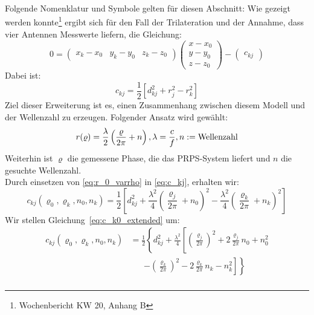 {
\small
Folgende Nomenklatur und Symbole gelten für diesen Abschnitt:
%
Wie gezeigt werden konnte\footnote{Wochenbericht KW 20, Anhang B} ergibt sich für den Fall der Trilateration und der Annahme, dass vier Antennen Messwerte liefern, die Gleichung:
\begin{equation}\label{eq:final_trilateration_model}
0=
\left(
	\begin{array}{ccc}
		x_k-x_0 & y_k-y_0 & z_k-z_0 
	\end{array}
\right)
\left(
   \begin{array}{c}
	   x-x_0\\
	   y-y_0\\
	   z-z_0
   \end{array}
\right)
-
\left(
	\begin{array}{c}
		c_{kj}
	\end{array}
\right) 
\end{equation}
%
Dabei ist:
\begin{equation}\label{eq:c_kj}
	c_{kj}=\frac{1}{2}[d_{kj}^2+r_{j}^2-r_k^2]
\end{equation}
%
Ziel dieser Erweiterung ist es, einen Zusammenhang zwischen diesem Modell und der Wellenzahl zu erzeugen. Folgender Ansatz wird gewählt:
	\begin{equation}\label{eq:r_0_varrho} r(\varrho)=\frac{\lambda}{2}\left(\frac{\varrho}{2\pi}+n\right),\\\lambda=\frac{c}{f}, n:= \text{Wellenzahl}
\end{equation}
%
%
Weiterhin ist $\varrho$ die gemessene Phase, die das PRPS-System liefert und $n$ die gesuchte Wellenzahl.\\
Durch einsetzen von \eqref{eq:r_0_varrho} in \eqref{eq:c_kj}, erhalten wir:
\begin{equation}\label{eq:c_k0_extended}
	c_{kj}(\varrho_0, \varrho_k, n_0, n_k) =\frac{1}{2}\left[d_{kj}^2+\frac{\lambda^2}{4}\left(\frac{\varrho_j}{2\pi}+n_0\right)^2-\frac{\lambda^2}{4}\left(\frac{\varrho_k}{2\pi}+n_k\right)^2\right]
\end{equation}
%
Wir stellen Gleichung~\eqref{eq:c_k0_extended} um:
\begin{align}
%	
	c_{kj}(\varrho_0, \varrho_k, n_0, n_k) &= \frac{1}{2}\left\{d_{kj}^2+\frac{\lambda^2}{4}\left[\left(\frac{\varrho_j}{2\pi}\right)^2+2\frac{\varrho_j}{2\pi}n_0+n_0^2 \right.\right.\nonumber\\
	&\phantom{=}\; 
	\left.\left.-\left(\frac{\varrho_k}{2\pi}\right)^2-2\frac{\varrho_k}{2\pi}n_k-n_k^2\right]\right\}\\

\end{align}}
